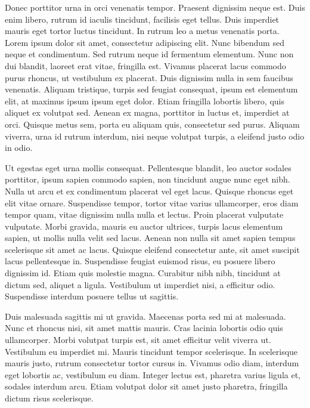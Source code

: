 \documentclass[a4paper, 11pt, titlepage, twocolumn]{article}
\begin{document}
Donec porttitor urna in orci venenatis tempor. Praesent dignissim neque est. Duis enim libero, rutrum id iaculis tincidunt, facilisis eget tellus. Duis imperdiet mauris eget tortor luctus tincidunt. In rutrum leo a metus venenatis porta. Lorem ipsum dolor sit amet, consectetur adipiscing elit. Nunc bibendum sed neque et condimentum. Sed rutrum neque id fermentum elementum. Nunc non dui blandit, laoreet erat vitae, fringilla est. Vivamus placerat lacus commodo purus rhoncus, ut vestibulum ex placerat. Duis dignissim nulla in sem faucibus venenatis. Aliquam tristique, turpis sed feugiat consequat, ipsum est elementum elit, at maximus ipsum ipsum eget dolor. Etiam fringilla lobortis libero, quis aliquet ex volutpat sed. Aenean ex magna, porttitor in luctus et, imperdiet at orci. Quisque metus sem, porta eu aliquam quis, consectetur sed purus. Aliquam viverra, urna id rutrum interdum, nisi neque volutpat turpis, a eleifend justo odio in odio.

Ut egestas eget urna mollis consequat. Pellentesque blandit, leo auctor sodales porttitor, ipsum sapien commodo sapien, non tincidunt augue nunc eget nibh. Nulla ut arcu et ex condimentum placerat vel eget lacus. Quisque rhoncus eget elit vitae ornare. Suspendisse tempor, tortor vitae varius ullamcorper, eros diam tempor quam, vitae dignissim nulla nulla et lectus. Proin placerat vulputate vulputate. Morbi gravida, mauris eu auctor ultrices, turpis lacus elementum sapien, ut mollis nulla velit sed lacus. Aenean non nulla sit amet sapien tempus scelerisque sit amet ac lacus. Quisque eleifend consectetur ante, sit amet suscipit lacus pellentesque in. Suspendisse feugiat euismod risus, eu posuere libero dignissim id. Etiam quis molestie magna. Curabitur nibh nibh, tincidunt at dictum sed, aliquet a ligula. Vestibulum ut imperdiet nisi, a efficitur odio. Suspendisse interdum posuere tellus ut sagittis.

Duis malesuada sagittis mi ut gravida. Maecenas porta sed mi at malesuada. Nunc et rhoncus nisi, sit amet mattis mauris. Cras lacinia lobortis odio quis ullamcorper. Morbi volutpat turpis est, sit amet efficitur velit viverra ut. Vestibulum eu imperdiet mi. Mauris tincidunt tempor scelerisque. In scelerisque mauris justo, rutrum consectetur tortor cursus in. Vivamus odio diam, interdum eget lobortis ac, vestibulum eu diam. Integer lectus est, pharetra varius ligula et, sodales interdum arcu. Etiam volutpat dolor sit amet justo pharetra, fringilla dictum risus scelerisque.
\end{document}
